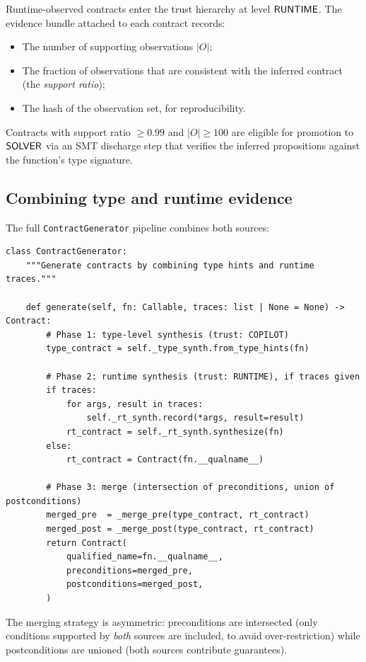 \documentclass[11pt]{article}
\begin{document}
Runtime-observed contracts enter the trust hierarchy at level
$\mathsf{RUNTIME}$.  The evidence bundle attached to each contract records:
\begin{itemize}
  \item The number of supporting observations $|O|$;
  \item The fraction of observations that are consistent with the
    inferred contract (the \emph{support ratio});
  \item The hash of the observation set, for reproducibility.
\end{itemize}

Contracts with support ratio $\ge 0.99$ and $|O| \ge 100$ are eligible
for promotion to $\mathsf{SOLVER}$ via an SMT discharge step that verifies the
inferred propositions against the function's type signature.

\subsection{Combining type and runtime evidence}

The full \texttt{ContractGenerator} pipeline combines both sources:

\begin{lstlisting}[style=jugeo-python,
  caption={\texttt{ContractGenerator}: combining type and runtime evidence.}]
class ContractGenerator:
    """Generate contracts by combining type hints and runtime traces."""

    def generate(self, fn: Callable, traces: list | None = None) -> Contract:
        # Phase 1: type-level synthesis (trust: COPILOT)
        type_contract = self._type_synth.from_type_hints(fn)

        # Phase 2: runtime synthesis (trust: RUNTIME), if traces given
        if traces:
            for args, result in traces:
                self._rt_synth.record(*args, result=result)
            rt_contract = self._rt_synth.synthesize(fn)
        else:
            rt_contract = Contract(fn.__qualname__)

        # Phase 3: merge (intersection of preconditions, union of postconditions)
        merged_pre  = _merge_pre(type_contract, rt_contract)
        merged_post = _merge_post(type_contract, rt_contract)
        return Contract(
            qualified_name=fn.__qualname__,
            preconditions=merged_pre,
            postconditions=merged_post,
        )
\end{lstlisting}

The merging strategy is asymmetric: preconditions are intersected
(only conditions supported by \emph{both} sources are included, to
avoid over-restriction) while postconditions are unioned (both sources
contribute guarantees).
\end{document}
